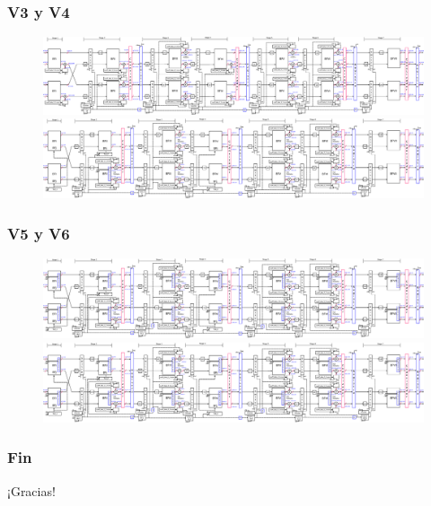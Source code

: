 \documentclass[t]{beamer}
\begin{document}
\begin{frame}
\frametitle{V3  y V4}	
\vspace*{0.5cm}
 \begin{figure}[ht]
    \centering
  \includegraphics[height=0.25\paperheight]{image/V3_esquema.eps} \\
\hfill
  \includegraphics[height=0.25\paperheight]{image/V4_esquema.eps}
    \end{figure}
\end{frame}



\begin{frame}
\frametitle{V5 y V6}	
\vspace*{0.5cm}
 \begin{figure}[ht]
    \centering
  \includegraphics[height=0.25\paperheight]{image/V5_esquema.eps} \\
\hfill
  \includegraphics[height=0.25\paperheight]{image/V5_esquema.eps}
    \end{figure}
\end{frame}




\begin{frame}
 \frametitle{Fin}
\vspace*{2cm}
\centering
\begin{Huge}
    ¡Gracias!
\end{Huge}
\end{frame}
\end{document}
